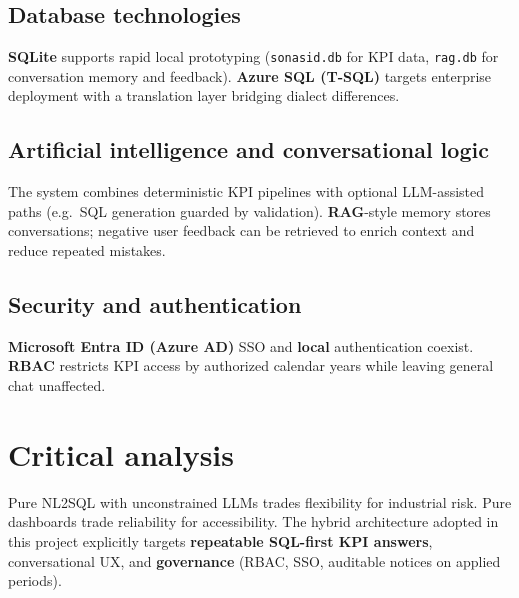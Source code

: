 \subsection{Database technologies}
\textbf{SQLite} supports rapid local prototyping (\texttt{sonasid.db} for KPI data, \texttt{rag.db} for conversation memory and feedback). \textbf{Azure SQL (T-SQL)} targets enterprise deployment with a translation layer bridging dialect differences.

\subsection{Artificial intelligence and conversational logic}
The system combines deterministic KPI pipelines with optional LLM-assisted paths (e.g.\ SQL generation guarded by validation). \textbf{RAG}-style memory stores conversations; negative user feedback can be retrieved to enrich context and reduce repeated mistakes.

\subsection{Security and authentication}
\textbf{Microsoft Entra ID (Azure AD)} SSO and \textbf{local} authentication coexist. \textbf{RBAC} restricts KPI access by authorized calendar years while leaving general chat unaffected.

\section{Critical analysis}
Pure NL2SQL with unconstrained LLMs trades flexibility for industrial risk. Pure dashboards trade reliability for accessibility. The hybrid architecture adopted in this project explicitly targets \textbf{repeatable SQL-first KPI answers}, conversational UX, and \textbf{governance} (RBAC, SSO, auditable notices on applied periods).
